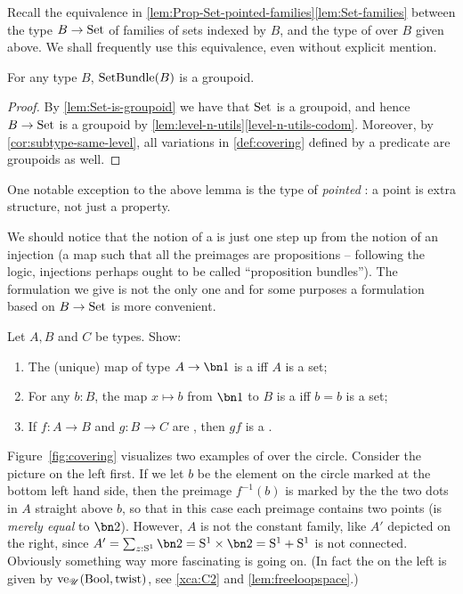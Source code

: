Recall the equivalence in \cref{lem:Prop-Set-pointed-families}\ref{lem:Set-families}
between the type $B\to\mathrm{Set}$ of families of sets indexed by $B$, and the type
of \coverings over $B$ given above.
We shall frequently use this equivalence, even without explicit mention.

\begin{lemma}\label{lem:setbundle-is-groupoid}
For any type $B$, $\mathrm{SetBundle}(B)$ is a groupoid.
\end{lemma}
\begin{proof}
By \cref{lem:Set-is-groupoid} we have that $\mathrm{Set}$ is a groupoid,
and hence $B\to\mathrm{Set}$ is a groupoid by \cref{lem:level-n-utils}\ref{level-n-utils-codom}.
Moreover, by \cref{cor:subtype-same-level}, all variations in \cref{def:covering}
defined by a predicate are groupoids as well.
\end{proof}
One notable exception to the above lemma is the type of \emph{pointed} \coverings:
a point is extra structure, not just a property.

We should notice that the notion of a \covering is just one step up from the notion of an
injection (a map such that all the preimages are propositions --
following the logic, injections perhaps ought to be called ``proposition bundles'').
The formulation we give is not the only one and for some purposes a formulation
based on $B\to\mathrm{Set}$ is more convenient.

\begin{xca}\label{xca:constant-cover}
Let $A,B$ and $C$ be types. Show:
\begin{enumerate}
\item The (unique) map of type $A\to\bn 1$ is a \covering iff $A$ is a set;
\item For any $b:B$, the map $x \mapsto b$ from $\bn 1$ to $B$ is
a \covering iff $b=b$ is a set;
\item If $f: A\to B$ and $g: B\to C$ are \coverings, then $gf$ is a \covering.\endproof
\end{enumerate}
\end{xca}

Figure~\ref{fig:covering} visualizes two examples of \coverings over the circle.
Consider the picture on the left first.
If we let $b$ be the element on the circle marked at the bottom left hand side,
then the preimage $f^{-1}(b)$ is marked by the the two dots in $A$ straight above $b$,
so that in this case each preimage contains two points (is \emph{merely equal} to $\bn 2$).
However, $A$ is not the constant family, like $A'$ depicted on the right, since
$A'=\sum_{z:\Sc}\bn 2=\Sc\times\bn 2=\Sc+\Sc$ is not connected.
Obviously something way more fascinating is going on.
(In fact the \covering on the left is given by $\ve_\UU(\bool,\twist)$,
see \cref{xca:C2} and \cref{lem:freeloopspace}.)

